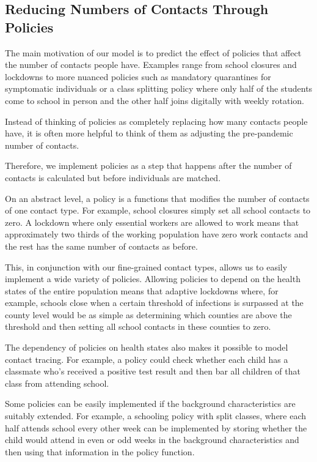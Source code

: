 \subsection{Reducing Numbers of Contacts Through Policies}
\label{sec:policies}

The main motivation of our model is to predict the effect of policies that affect the number of contacts people have. Examples range from school closures and lockdowns to more nuanced policies such as mandatory quarantines for symptomatic individuals or a class splitting policy where only half of the students come to school in person and the other half joins digitally with weekly rotation.

Instead of thinking of policies as completely replacing how many contacts people have, it is often more helpful to think of them as adjusting the pre-pandemic number of contacts.

Therefore, we implement policies as a step that happens after the number of contacts is calculated but before individuals are matched.

On an abstract level, a policy is a functions that modifies the number of contacts of one contact type. For example, school closures simply set all school contacts to zero. A lockdown where only essential workers are allowed to work means that approximately two thirds of the working population have zero work contacts and the rest has the same number of contacts as before.

This, in conjunction with our fine-grained contact types, allows us to easily implement a wide variety of policies. Allowing policies to depend on the health states of the entire population means that adaptive lockdowns where, for example, schools close when a certain threshold of infections is surpassed at the county level would be as simple as determining which counties are above the threshold and then setting all school contacts in these counties to zero.

The dependency of policies on health states also makes it possible to model contact tracing. For example, a policy could check whether each child has a classmate who's received a positive test result and then bar all children of that class from attending school.

Some policies can be easily implemented if the background characteristics are suitably extended. For example, a schooling policy with split classes, where each half attends school every other week can be implemented by storing whether the child would attend in even or odd weeks in the background characteristics and then using that information in the policy function.

